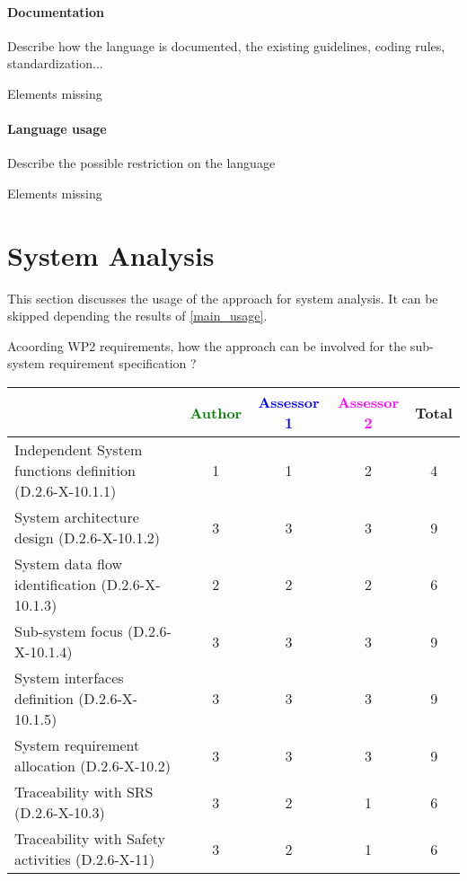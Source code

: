 \paragraph{Documentation} Describe how the language is documented, the existing guidelines, coding rules, standardization...


\begin{assessor2}
Elements missing
\end{assessor2}


\paragraph{Language usage} Describe the possible restriction on the language


\begin{assessor2}
Elements missing
\end{assessor2}



\section{System Analysis}
This section discusses the usage of the approach for system analysis.
It can be skipped depending the results of \ref{main_usage}.

Acoording WP2 requirements, how the approach can be involved for the sub-system requirement specification ?

\begin{tabular}{|l | c | c | c | c|}
\hline
& \textcolor{green}{Author} & \textcolor{blue}{Assessor 1} & \textcolor{magenta}{Assessor 2} & Total \\
\hline
Independent System functions definition (D.2.6-X-10.1.1) & 1 & 1 & 2 & 4 \\
\hline
System architecture design (D.2.6-X-10.1.2) & 3 & 3 & 3  & 9 \\
\hline
System data flow identification (D.2.6-X-10.1.3) & 2 & 2 & 2 & 6 \\
\hline
Sub-system focus (D.2.6-X-10.1.4) & 3 & 3 & 3 & 9 \\
\hline
System interfaces definition (D.2.6-X-10.1.5) & 3 & 3 & 3 &  9\\
\hline
System requirement allocation (D.2.6-X-10.2) & 3 & 3 & 3 & 9 \\
\hline
Traceability with SRS (D.2.6-X-10.3) & 3 & 2 & 1 & 6 \\
\hline
Traceability with Safety activities (D.2.6-X-11) & 3 & 2 & 1 & 6 \\
\hline
\end{tabular}


